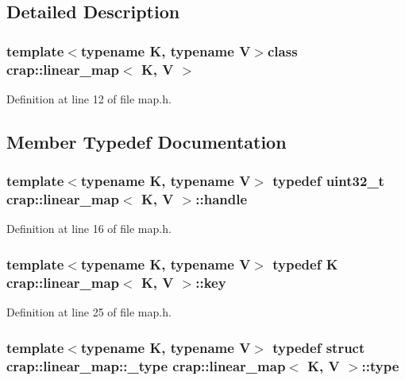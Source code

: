 \subsection{Detailed Description}
\subsubsection*{template$<$typename K, typename V$>$class crap\+::linear\+\_\+map$<$ K, V $>$}



Definition at line 12 of file map.\+h.



\subsection{Member Typedef Documentation}
\hypertarget{classcrap_1_1linear__map_af77a9e092bd3ffb9557327bd3082e47f}{
\subsubsection[{handle}]{\setlength{\rightskip}{0pt plus 5cm}template$<$typename K, typename V$>$ typedef uint32\+\_\+t {\bf crap\+::linear\+\_\+map}$<$ K, V $>$\+::{\bf handle}}}\label{classcrap_1_1linear__map_af77a9e092bd3ffb9557327bd3082e47f}


Definition at line 16 of file map.\+h.

\hypertarget{classcrap_1_1linear__map_a710c4784756c34edffaba22d614a0af0}{
\subsubsection[{key}]{\setlength{\rightskip}{0pt plus 5cm}template$<$typename K, typename V$>$ typedef K {\bf crap\+::linear\+\_\+map}$<$ K, V $>$\+::{\bf key}}}\label{classcrap_1_1linear__map_a710c4784756c34edffaba22d614a0af0}


Definition at line 25 of file map.\+h.

\hypertarget{classcrap_1_1linear__map_ad8544be54068ac03936e6696c076bf9a}{
\subsubsection[{type}]{\setlength{\rightskip}{0pt plus 5cm}template$<$typename K, typename V$>$ typedef struct {\bf crap\+::linear\+\_\+map\+::\+\_\+type}
     {\bf crap\+::linear\+\_\+map}$<$ K, V $>$\+::{\bf type}}}\label{classcrap_1_1linear__map_ad8544be54068ac03936e6696c076bf9a}


